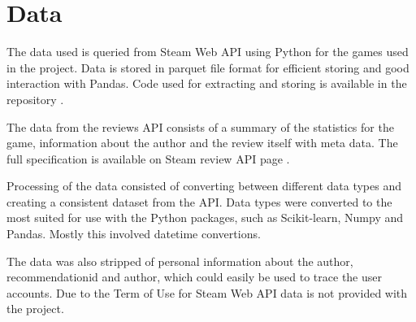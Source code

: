 \chapter{Data}
\label{cha:data}

The data used is queried from Steam Web API \cite{steamworks} using Python for the games used in the project. 
Data is stored in parquet file format \cite{apacheparquet} for efficient storing and good interaction with Pandas.
Code used for extracting and storing is available in the repository \cite{repostitory}.

The data from the reviews API consists of a summary of the statistics for the game, information about the author and the review itself with meta data. 
The full specification is available on Steam review API page \cite{steamworks}.

Processing of the data consisted of converting between different data types and creating a consistent dataset from the API. 
Data types were converted to the most suited for use with the Python packages, such as Scikit-learn, Numpy and Pandas.
Mostly this involved datetime convertions.

The data was also stripped of personal information about the author, recommendationid and author, which could easily be used to trace the user accounts.
Due to the Term of Use for Steam Web API \cite{steamapi} data is not provided with the project.
